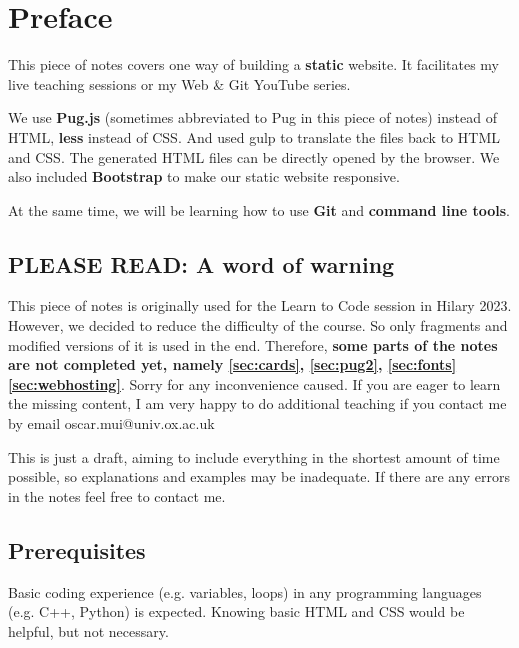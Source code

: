 \chapter*{Preface}

This piece of notes covers one way of building a \textbf{static} website. It facilitates my live teaching sessions or my Web \& Git YouTube series.
\vspace{6mm}

We use \textbf{Pug.js} (sometimes abbreviated to Pug in this piece of notes) instead of HTML, \textbf{less} instead of CSS. And used gulp to translate the files back to HTML and CSS. The generated HTML files can be directly opened by the browser. We also included \textbf{Bootstrap} to make our static website responsive.
\vspace{6mm}

At the same time, we will be learning how to use \textbf{Git} and \textbf{command line tools}.

\section{PLEASE READ: A word of warning}
\label{sec:incompletewarning}
This piece of notes is originally used for the Learn to Code session in Hilary 2023. However, we decided to reduce the difficulty of the course. So only fragments and modified versions of it is used in the end. Therefore, \textbf{some parts of the notes are not completed yet, namely \cref{sec:cards}, \cref{sec:pug2}, \cref{sec:fonts} \cref{sec:webhosting}}. Sorry for any inconvenience caused. If you are eager to learn the missing content, I am very happy to do additional teaching if you contact me by email oscar.mui@univ.ox.ac.uk

This is just a draft, aiming to include everything in the shortest amount of time possible, so explanations and examples may be inadequate. If there are any errors in the notes feel free to contact me.

\section{Prerequisites}

Basic coding experience (e.g. variables, loops) in any programming languages (e.g. C++, Python) is expected. Knowing basic HTML and CSS would be helpful, but not necessary. 

